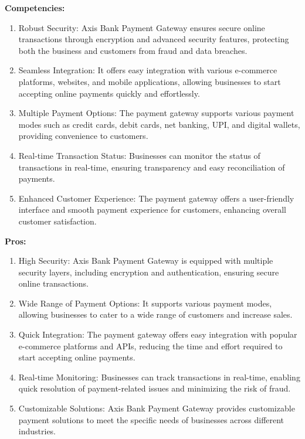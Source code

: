 \textbf{Competencies:}

\begin{enumerate}
  \item Robust Security: Axis Bank Payment Gateway ensures secure online transactions through encryption and advanced security features, protecting both the business and customers from fraud and data breaches.
  \item Seamless Integration: It offers easy integration with various e-commerce platforms, websites, and mobile applications, allowing businesses to start accepting online payments quickly and effortlessly.
  \item Multiple Payment Options: The payment gateway supports various payment modes such as credit cards, debit cards, net banking, UPI, and digital wallets, providing convenience to customers.
  \item Real-time Transaction Status: Businesses can monitor the status of transactions in real-time, ensuring transparency and easy reconciliation of payments.
  \item Enhanced Customer Experience: The payment gateway offers a user-friendly interface and smooth payment experience for customers, enhancing overall customer satisfaction.
\end{enumerate}

\textbf{Pros:}

\begin{enumerate}
  \item High Security: Axis Bank Payment Gateway is equipped with multiple security layers, including encryption and authentication, ensuring secure online transactions.
  \item Wide Range of Payment Options: It supports various payment modes, allowing businesses to cater to a wide range of customers and increase sales.
  \item Quick Integration: The payment gateway offers easy integration with popular e-commerce platforms and APIs, reducing the time and effort required to start accepting online payments.
  \item Real-time Monitoring: Businesses can track transactions in real-time, enabling quick resolution of payment-related issues and minimizing the risk of fraud.
  \item Customizable Solutions: Axis Bank Payment Gateway provides customizable payment solutions to meet the specific needs of businesses across different industries.
\end{enumerate}

